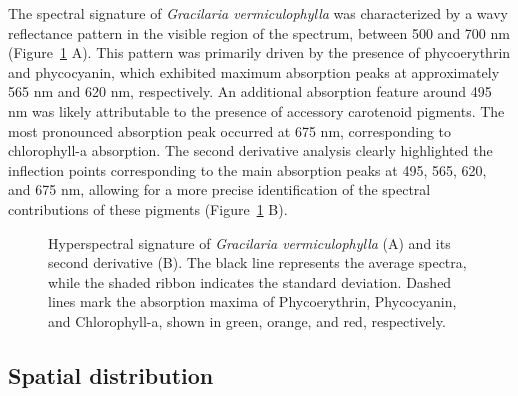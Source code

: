 \documentclass[
  letterpaper,
  DIV=11,
  numbers=noendperiod]{scrartcl}
\begin{document}
The spectral signature of \emph{Gracilaria vermiculophylla} was
characterized by a wavy reflectance pattern in the visible region of the
spectrum, between 500 and 700 nm (Figure~\ref{fig-SpecDescri} A). This
pattern was primarily driven by the presence of phycoerythrin and
phycocyanin, which exhibited maximum absorption peaks at approximately
565 nm and 620 nm, respectively. An additional absorption feature around
495 nm was likely attributable to the presence of accessory carotenoid
pigments. The most pronounced absorption peak occurred at 675 nm,
corresponding to chlorophyll-a absorption. The second derivative
analysis clearly highlighted the inflection points corresponding to the
main absorption peaks at 495, 565, 620, and 675 nm, allowing for a more
precise identification of the spectral contributions of these pigments
(Figure~\ref{fig-SpecDescri} B).

\label{cell-fig-SpecDescri}
\begin{figure}[H]


\caption{\label{fig-SpecDescri}Hyperspectral signature of
\emph{Gracilaria vermiculophylla} (A) and its second derivative (B). The
black line represents the average spectra, while the shaded ribbon
indicates the standard deviation. Dashed lines mark the absorption
maxima of Phycoerythrin, Phycocyanin, and Chlorophyll-a, shown in green,
orange, and red, respectively.}

\end{figure}%

\subsection{Spatial distribution}\label{spatial-distribution}
\end{document}

